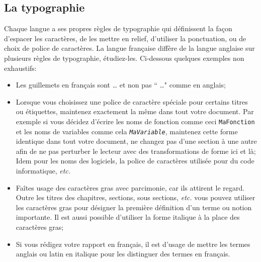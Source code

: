 \documentclass{rapport}
\def\etc{\textit{etc.}\xspace}
\begin{document}
      \subsection{La typographie}
        Chaque langue a ses propres règles de typographie qui définissent la façon d'espacer les caractères, de les mettre en relief, d'utiliser la ponctuation, ou de choix de police de caractères. La langue française diffère de la langue anglaise sur plusieurs règles de typographie, étudiez-les. Ci-dessous quelques exemples non exhaustifs:
        \begin{itemize}
          \item Les guillemets en français sont \og{} \dots \fg{} et non pas `` \dots " comme en anglais;
          \item Lorsque vous choisissez une police de caractère spéciale pour certains titres ou étiquettes, maintenez exactement la même dans tout votre document. Par exemple si vous décidez d'écrire les noms de fonction  comme ceci \texttt{MaFonction} et les noms de variables comme cela \texttt{\it MaVariable}, maintenez cette forme identique dans tout votre document,  ne changez pas d'une section à une autre afin de ne pas perturber le lecteur avec des transformations de forme ici et là; Idem pour les noms des logiciels,  la police de caractères utilisée pour du code informatique, \etc
           \item Faîtes usage des caractères gras avec parcimonie, car ils attirent le regard. Outre les titres des chapitres, sections, sous sections, \etc vous pouvez utiliser les caractères gras pour désigner la première définition d'un terme ou notion importante. Il est aussi possible d'utiliser la forme italique à la place des caractères gras;
          \item Si vous rédigez votre rapport en français, il est d'usage de mettre les termes anglais ou latin en italique pour les distinguer des termes en français. 
        \end{itemize}
      
\end{document}
